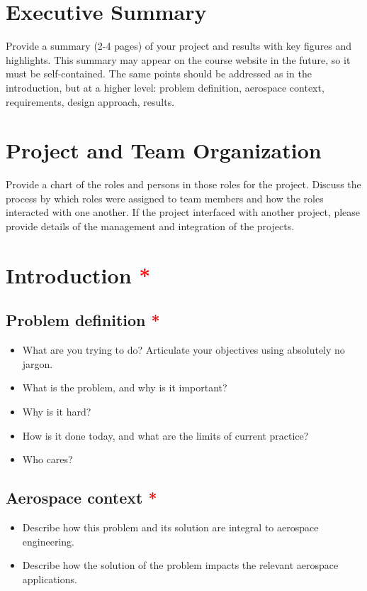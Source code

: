 \documentclass[]{aiaa-tc}%
\newcommand{\reqd}{\textcolor{red}{*}}
\begin{document}
\section*{Executive Summary}

Provide a summary (2-4 pages) of your project and results with key figures and highlights.  This summary may appear on the course website in the future, so it must be self-contained.  The same points should be addressed as in the introduction, but at a higher level:  problem definition, aerospace context, requirements, design approach, results.

\section*{Project and Team Organization}

Provide a chart of the roles and persons in those roles for the project.  Discuss the process by which roles were assigned to team members and how the roles interacted with one another.  If the project interfaced with another project, please provide details of the management and integration of the projects.

\section{Introduction \reqd}

\subsection{Problem definition \reqd}
\begin{itemize}
\item What are you trying to do? Articulate your objectives using absolutely no jargon.  
\item What is the problem, and why is it important?  
\item Why is it hard?
\item How is it done today, and what are the limits of current practice? 
\item Who cares?
\end{itemize}

\subsection{Aerospace context \reqd}
\begin{itemize}
\item Describe how this problem and its solution are integral to aerospace engineering.  
\item Describe how the solution of the problem impacts the relevant aerospace applications.
\end{itemize}
\end{document}
